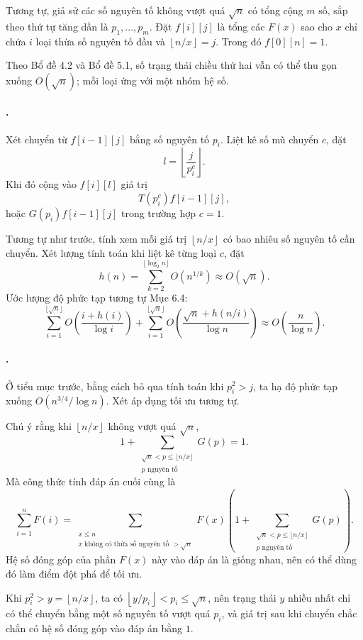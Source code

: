 \documentclass[11pt]{article}
\begin{document}
Tương tự, giả sử các số nguyên tố không vượt quá \(\sqrt n\) có tổng cộng
\(m\) số, sắp theo thứ tự tăng dần là \(p_1,\ldots,p_m\). Đặt \(f[i][j]\) là
tổng các \(F(x)\) sao cho \(x\) chỉ chứa \(i\) loại thừa số nguyên tố đầu và
\(\left\lfloor n/x\right\rfloor=j\). Trong đó \(f[0][n]=1\).

Theo Bổ đề 4.2 và Bổ đề 5.1, số trạng thái chiều thứ hai vẫn có thể thu gọn
xuống \(O(\sqrt n)\); mỗi loại ứng với một nhóm hệ số.

\paragraph{.}
Xét chuyển từ \(f[i-1][j]\) bằng số nguyên tố \(p_i\). Liệt kê số mũ chuyển
\(c\), đặt
\[
  l=\left\lfloor\frac{j}{p_i^c}\right\rfloor.
\]
Khi đó cộng vào \(f[i][l]\) giá trị
\[
  T(p_i^c)f[i-1][j],
\]
hoặc \(G(p_i)f[i-1][j]\) trong trường hợp \(c=1\).

Tương tự như trước, tính xem mỗi giá trị \(\left\lfloor n/x\right\rfloor\)
có bao nhiêu số nguyên tố cần chuyển. Xét lượng tính toán khi liệt kê từng
loại \(c\), đặt
\[
  h(n)=\sum_{k=2}^{\lfloor\log_2 n\rfloor} O(n^{1/k})\approx O(\sqrt n).
\]
Ước lượng độ phức tạp tương tự Mục 6.4:
\[
  \sum_{i=1}^{\lfloor\sqrt n\rfloor}
  O\left(\frac{i+h(i)}{\log i}\right)
  +
  \sum_{i=1}^{\lfloor\sqrt n\rfloor}
  O\left(\frac{\sqrt n+h(n/i)}{\log n}\right)
  \approx
  O\left(\frac{n}{\log n}\right).
\]

\paragraph{.}
Ở tiểu mục trước, bằng cách bỏ qua tính toán khi \(p_i^2>j\), ta hạ độ phức
tạp xuống \(O(n^{3/4}/\log n)\). Xét áp dụng tối ưu tương tự.

Chú ý rằng khi \(\left\lfloor n/x\right\rfloor\) không vượt quá \(\sqrt n\),
\[
  1+\sum_{\substack{\sqrt n<p\le \lfloor n/x\rfloor\\p\text{ nguyên tố}}}G(p)
  =1.
\]
Mà công thức tính đáp án cuối cùng là
\[
  \sum_{i=1}^{n}F(i)
  =
  \sum_{\substack{x\le n\\x\text{ không có thừa số nguyên tố }>\sqrt n}}
  F(x)
  \left(
    1+\sum_{\substack{\sqrt n<p\le \lfloor n/x\rfloor\\p\text{ nguyên tố}}}
    G(p)
  \right).
\]
Hệ số đóng góp của phần \(F(x)\) này vào đáp án là giống nhau, nên có thể dùng
đó làm điểm đột phá để tối ưu.

Khi \(p_i^2>y=\left\lfloor n/x\right\rfloor\), ta có
\(\left\lfloor y/p_i\right\rfloor<p_i\le\sqrt n\), nên trạng thái \(y\) nhiều
nhất chỉ có thể chuyển bằng một số nguyên tố vượt quá \(p_i\), và giá trị sau
khi chuyển chắc chắn có hệ số đóng góp vào đáp án bằng \(1\).
\end{document}
